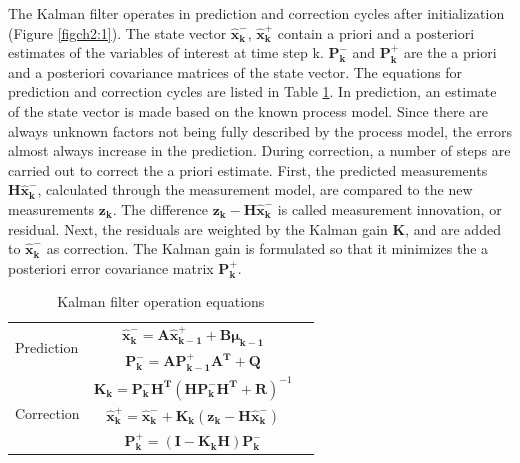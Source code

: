 The Kalman filter operates in prediction and correction cycles after
initialization (Figure \ref{figch2:1}). The state vector
$\boldsymbol{\hat{x}^-_k}$, $\boldsymbol{\hat{x}^+_k}$ contain a
priori and a posteriori estimates of the variables of interest at time
step k. $\boldsymbol{P^-_k}$ and $\boldsymbol{P^+_k}$ are the a priori
and a posteriori covariance matrices of the state vector. The
equations for prediction and correction cycles are listed in Table
\ref{tab:KF}. In prediction, an estimate of the state vector is made
based on the known process model. Since there are always unknown
factors not being fully described by the process model, the errors
almost always increase in the prediction. During correction, a number
of steps are carried out to correct the a priori estimate. First, the
predicted measurements $\boldsymbol{H\hat{x}^-_k}$, calculated through
the measurement model, are compared to the new measurements
$\boldsymbol{z_k}$. The difference
$\boldsymbol{z_k}-\boldsymbol{H\hat{x}^-_k}$ is called measurement
innovation, or residual. Next, the residuals are weighted by the
Kalman gain $\boldsymbol{K}$, and are added to
$\boldsymbol{\hat{x}^-_k}$ as correction. The Kalman gain is
formulated so that it minimizes the a posteriori error covariance
matrix $\boldsymbol{P^+_k}$.

\begin{table}
\caption{Kalman filter operation equations}
\label{tab:KF}
\centering
\begin{tabular}{|l|c r|}
  \hline
  \multirow{2}{*}{Prediction} 
  & $\boldsymbol{\hat{x}^-_k}=\boldsymbol{A\hat{x}^+_{k-1}}+\boldsymbol{B\mu_{k-1}}$ 
  & \stepcounter{equation}\thetag{\theequation}\\
  & $\boldsymbol{P^-_k} = \boldsymbol{AP^+_{k-1}A^T}+\boldsymbol{Q}$ 
  & \stepcounter{equation}\thetag{\theequation}\\
  \hline
  \multirow{3}{*}{Correction}
  & $\boldsymbol{K_k}=\boldsymbol{P^-_kH^T}(\boldsymbol{HP^-_kH^T}+\boldsymbol{R})^{-1}$  
  & \stepcounter{equation}\thetag{\theequation}\\
  & $\boldsymbol{\hat{x}^+_k}=\boldsymbol{\hat{x}^-_k}+\boldsymbol{K_k}(\boldsymbol{z_k}-\boldsymbol{H\hat{x}^-_k})$ 
  & \stepcounter{equation}\thetag{\theequation}\\
  & $\boldsymbol{P^+_k}=(\boldsymbol{I}-\boldsymbol{K_kH})\boldsymbol{P^-_k}$ 
  & \stepcounter{equation}\thetag{\theequation}\\
  \hline
\end{tabular}
\end{table}
\FloatBarrier

